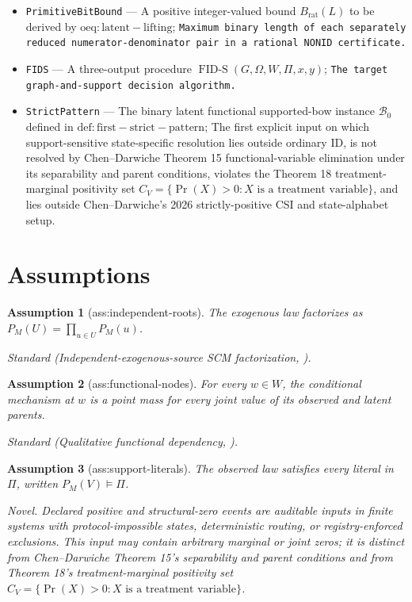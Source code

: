 \documentclass{article}
\newtheorem{assumption}{Assumption}
\begin{document}
\begin{itemize}
  \item \texttt{PrimitiveBitBound} --- A positive integer-valued bound \(B_{\mathrm{rat}}(L)\) to be derived by \(\mathrm{oeq:latent-lifting}\); \texttt{Maximum binary length of each separately reduced numerator-\allowbreak{}denominator pair in a rational NONID certificate.}
  \item \texttt{FIDS} --- A three-output procedure \(\operatorname{FID\text{-}S}(G,\Omega,W,\Pi,x,y)\); \texttt{The target graph-\allowbreak{}and-\allowbreak{}support decision algorithm.}
  \item \texttt{StrictPattern} --- The binary latent functional supported-bow instance \(\mathcal B_0\) defined in \(\mathrm{def:first-strict-pattern}\); The first explicit input on which support-sensitive state-specific resolution lies outside ordinary ID, is not resolved by Chen--Darwiche Theorem 15 functional-variable elimination under its separability and parent conditions, violates the Theorem 18 treatment-marginal positivity set \(C_V=\{\Pr(X)>0:X\text{ is a treatment variable}\}\), and lies outside Chen--Darwiche's 2026 strictly-positive CSI and state-alphabet setup.
\end{itemize}

\section{Assumptions}

\begin{assumption}[ass:independent-roots]\label{ass:independent-roots}
The exogenous law factorizes as \(P_M(U)=\prod_{u\in U}P_M(u)\).
\par\smallskip\noindent\emph{Standard} (Independent-exogenous-source SCM factorization, \cite{ShpitserPearl2008}).
\end{assumption}

\begin{assumption}[ass:functional-nodes]\label{ass:functional-nodes}
For every \(w\in W\), the conditional mechanism at \(w\) is a point mass for every joint value of its observed and latent parents.
\par\smallskip\noindent\emph{Standard} (Qualitative functional dependency, \cite{ChenDarwiche2024}).
\end{assumption}

\begin{assumption}[ass:support-literals]\label{ass:support-literals}
The observed law satisfies every literal in \(\Pi\), written \(P_M(V)\models\Pi\).
\par\smallskip\noindent\emph{Novel.} Declared positive and structural-zero events are auditable inputs in finite systems with protocol-impossible states, deterministic routing, or registry-enforced exclusions. This input may contain arbitrary marginal or joint zeros; it is distinct from Chen--Darwiche Theorem 15's separability and parent conditions and from Theorem 18's treatment-marginal positivity set \(C_V=\{\Pr(X)>0:X\text{ is a treatment variable}\}\).
\end{assumption}
\end{document}
